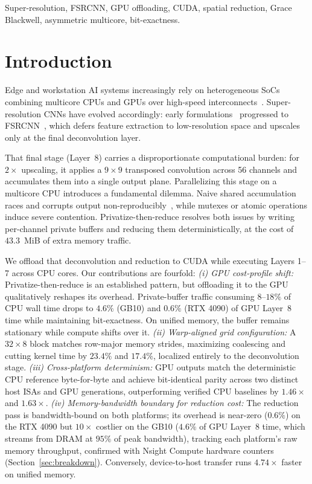 \documentclass[conference]{IEEEtran}
\begin{document}
\begin{IEEEkeywords}
Super-resolution, FSRCNN, GPU offloading, CUDA, spatial reduction, Grace Blackwell, asymmetric multicore, bit-exactness.
\end{IEEEkeywords}

\section{Introduction}

Edge and workstation AI systems increasingly rely on heterogeneous SoCs combining multicore CPUs and GPUs over high-speed interconnects~\cite{nvidiagracehopper2022,wahlgren2025upm}. Super-resolution CNNs have evolved accordingly: early formulations~\cite{dong2014srcnn} progressed to FSRCNN~\cite{dong2016fsrcnn}, which defers feature extraction to low-resolution space and upscales only at the final deconvolution layer.

That final stage (Layer~8) carries a disproportionate computational burden: for $2\times$ upscaling, it applies a $9{\times}9$ transposed convolution across 56 channels and accumulates them into a single output plane. Parallelizing this stage on a multicore CPU introduces a fundamental dilemma. Naive shared accumulation races and corrupts output non-reproducibly~\cite{annisa2025}, while mutexes or atomic operations induce severe contention. Privatize-then-reduce resolves both issues by writing per-channel private buffers and reducing them deterministically, at the cost of $43.3$~MiB of extra memory traffic.

We offload that deconvolution and reduction to CUDA while executing Layers 1--7 across CPU cores. Our contributions are fourfold: \emph{(i) GPU cost-profile shift:} Privatize-then-reduce is an established pattern, but offloading it to the GPU qualitatively reshapes its overhead. Private-buffer traffic consuming $8$--$18\%$ of CPU wall time drops to $4.6\%$ (GB10) and $0.6\%$ (RTX 4090) of GPU Layer~8 time while maintaining bit-exactness. On unified memory, the buffer remains stationary while compute shifts over it. \emph{(ii) Warp-aligned grid configuration:} A $32{\times}8$ block matches row-major memory strides, maximizing coalescing and cutting kernel time by $23.4\%$ and $17.4\%$, localized entirely to the deconvolution stage. \emph{(iii) Cross-platform determinism:} GPU outputs match the deterministic CPU reference byte-for-byte and achieve bit-identical parity across two distinct host ISAs and GPU generations, outperforming verified CPU baselines by $1.46\times$ and $1.63\times$. \emph{(iv) Memory-bandwidth boundary for reduction cost:} The reduction pass is bandwidth-bound on both platforms; its overhead is near-zero ($0.6\%$) on the RTX 4090 but $10\times$ costlier on the GB10 ($4.6\%$ of GPU Layer~8 time, which streams from DRAM at $95\%$ of peak bandwidth), tracking each platform's raw memory throughput, confirmed with Nsight Compute hardware counters (Section~\ref{sec:breakdown}). Conversely, device-to-host transfer runs $4.74\times$ faster on unified memory.
\end{document}

